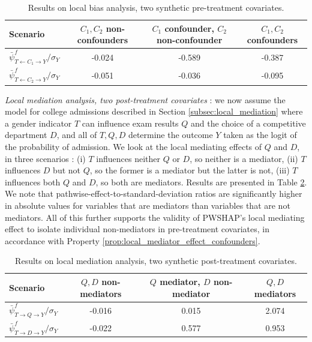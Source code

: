     
\begin{table}
\begin{tabular}{lccc}
\hline
Scenario & $C_1, C_2$ non-confounders & \makecell{$C_1$ confounder,\\$C_2$ non-confounder} & $C_1, C_2$ confounders \\ \hline
 $\bar{\psi}^f_{T \leftarrow C_1 \rightarrow Y} / \sigma_Y$ & -0.024 & -0.589 & -0.387 \\ \hline
 $\bar{\psi}^f_{T \leftarrow C_2 \rightarrow Y} / \sigma_Y$ & -0.051 & -0.036 & -0.095 \\
\end{tabular}
  \caption{Results on local bias analysis, two synthetic pre-treatment covariates. %
  }%
\label{tab:synthetic_xp_localbias_twovars}
\end{table}

\textit{Local mediation analysis, two post-treatment covariates} : we now assume the model for college admissions described in Section \ref{subsec:local_mediation} where a gender indicator $T$ can influence exam results $Q$ and the choice of a competitive department $D$, and all of $T, Q, D$ determine the outcome $Y$ taken as the logit of the probability of admission. We look at the local mediating effects of $Q$ and $D$, in three scenarios : (i) $T$ influences neither $Q$ or $D$, so neither is a mediator, (ii) $T$ influences $D$ but not $Q$, so the former is a mediator but the latter is not, (iii) $T$ influences both $Q$ and $D$, so both are mediators. Results are presented in Table \ref{tab:synthetic_xp_localmediation_twovars}. We note that pathwise-effect-to-standard-deviation ratios are significantly higher in absolute values for variables that are mediators than variables that are not mediators. All of this further supports the validity of PWSHAP's local mediating effect to isolate individual non-mediators in pre-treatment covariates, in accordance with Property \ref{prop:local_mediator_effect_confounders}.
    
\begin{table}
\begin{tabular}{lccc}
\hline
Scenario & $Q, D$ non-mediators & \makecell{$Q$ mediator,\\$D$ non-mediator} & $Q, D$ mediators \\ \hline
 $\bar{\psi}^f_{T \rightarrow Q \rightarrow Y} / \sigma_Y$ & -0.016 & 0.015 & 2.074 \\ \hline
 $\bar{\psi}^f_{T \rightarrow D \rightarrow Y} / \sigma_Y$ & -0.022 & 0.577 & 0.953 \\
\end{tabular}
  \caption{Results on local mediation analysis, two synthetic post-treatment covariates. %
  }%
\label{tab:synthetic_xp_localmediation_twovars}
\end{table}

